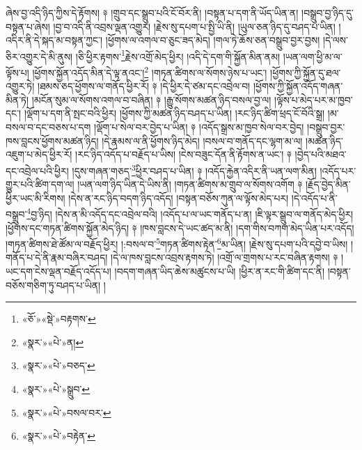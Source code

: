 ཞེས་བྱ་འདི་ཉིད་ཀྱིས་དེ་རྟོགས། ༈ །གྲུབ་དང་སྒྲུབ་པའི་ངོ་བོར་ནི། །བསྟན་པ་དག་ནི་ཡོད་ཡིན་ན། །བསྒྲུབ་བྱ་ཉིད་དུ་བསྟན་པ་ཞེས། །བྱ་བ་འདི་ནི་འབྲས་ལྡན་འགྱུར། །རྗེས་སུ་དཔག་པ་སྤྱི་ཡི་ནི། །ཡུལ་ཅན་ཉིད་དུ་བཤད་པ་ཡིན། །འདིར་ནི་དེ་སྐད་མ་བསྟན་ཀྱང་། །ཕྱོགས་ལ་འགལ་བ་ཅུང་ཟད་མེད། །གལ་ཏེ་ཆོས་ཅན་བསྒྲུབ་བྱར་བྱས། །དེ་ལས་ཅིར་འགྱུར་དེ་མི་ནུས། །ཅི་ཕྱིར་རྟགས་\footnote{«ཅོ་»«སྡེ་»བརྟགས་}རྗེས་འགྲོ་མེད་ཕྱིར། །འདི་དེ་དག་གི་སྐྱོན་མིན་ནམ། །ཡན་ལག་ཕྱི་མ་ལ་ལྟོས་པ། །ཕྱོགས་སྐྱོན་འདོད་མིན་དེ་ལྟ་ནའང་།\footnote{«སྣར་»«པེ་»ན།} །གཏན་ཚིགས་ལ་སོགས་ཉེས་པ་ཡང་། །ཕྱོགས་ཀྱི་སྐྱོན་དུ་ཐལ་འགྱུར་ཏེ། །ཐམས་ཅད་ཕྱོགས་ལ་གནོད་ཕྱིར་རོ། ༈ །དེ་ཕྱིར་དེ་ཙམ་དང་འབྲེལ་བ། །ཕྱོགས་ཀྱི་སྐྱོན་འདོད་གཞན་མིན་ཏེ། །མངོན་སུམ་ལ་སོགས་འགལ་བ་བཞིན། ༈ །རྒྱུ་སོགས་མཚན་ཉིད་བསལ་བྱ་ལ། །ལྟོས་པ་མེད་པར་མ་ཁྱབ་དང་། །ལྡོག་པ་དག་ནི་སྤང་བའི་ཕྱིར། །ཕྱོགས་ཀྱི་མཚན་ཉིད་བཤད་པ་ཡིན། །རང་ཉིད་ཚིག་ཕྲད་ངོ་བོའི་སྒྲ། །མ་བསལ་བ་དང་བཅས་པ་དག །ལྡོག་པ་སེལ་བར་བྱེད་པ་ཡིན། ༈ །འདོད་སྒྲས་མ་ཁྱབ་སེལ་བར་བྱེད། །བསྒྲུབ་བྱར་ཁས་བླངས་ཕྱོགས་མཚན་ཉིད། །དེ་རྣམས་ལ་ནི་ཕྱོགས་ཉིད་མེད། །བསལ་བ་གནོད་དང་ལྷག་མ་ལ། །མཚན་ཉིད་འཇུག་པ་མེད་ཕྱིར་རོ། །རང་ཉིད་འདོད་པ་བརྗོད་པ་ཡིས། །ངེས་བཟུང་དོན་ནི་རྟོགས་ན་ཡང་། ༈ །བྱེད་པའི་མཐའ་དང་འབྲེལ་པའི་ཕྱིར། །དུས་གཞན་གཅད་\footnote{«སྣར་»«པེ་»བཅད་}ཕྱིར་བཤད་པ་ཡིན། ༈ །འདོད་རྐྱེན་འདིར་ནི་ཡན་ལག་མིན། །འདོད་པར་གྱུར་པའི་ཚིག་དག་ལ། །ཡན་ལག་ཉིད་ཡིན་དེ་ཡིས་ནི། །གཏན་ཚིགས་མ་གྲུབ་ལ་སོགས་འགོག ༈ །རྗོད་བྱེད་མིན་ཕྱིར་ཡང་མི་རིགས། །དེས་ན་རང་ཉིད་བདག་ཉིད་འདོད། །བསྟན་བཅོས་ཀུན་ལ་ལྟོས་མེད་པར། །དེ་འདོད་པ་ནི་བསྒྲུབ་\footnote{«སྣར་»«པེ་»སྒྲུབ་}བྱ་ཉིད། །དེས་ན་མི་འདོད་དང་འབྲེལ་བའི། །འདོད་པ་ལ་ཡང་གནོད་པ་ན། །ཇི་ལྟར་སྒྲུབ་ལ་གནོད་མེད་ཕྱིར། །ཕྱོགས་དང་གཏན་ཚིགས་སྐྱོན་མེད་ཉིད། ༈ །ཁས་བླངས་དེ་ཡང་ཚད་མ་ནི། །དག་གིས་བཀག་མེད་ཡིན་པར་འདོད། །གཏན་ཚིགས་ཐེ་ཚོམ་ལ་བརྗོད་ཕྱིར། །:བསལ་བ་\footnote{«སྣར་»«པེ་»བསལ་བར་}གཏན་ཚིགས་རྟེན་\footnote{«སྣར་»«པེ་»བརྟེན་}མ་ཡིན། །རྗེས་སུ་དཔག་པའི་དབྱེ་བ་ཡིས། །གནོད་པ་དེ་ནི་རྣམ་བཞིར་བཤད། །དེ་ལ་ཁས་བླངས་འབྲས་རྟགས་ཏེ། །འགྲོ་ལ་གྲགས་པ་རང་བཞིན་རྟགས། ༈ །ཡང་དག་ངེས་ལྡན་བརྗོད་འདོད་པ། །བདག་གཞན་ཡིད་ཆེས་མཚུངས་པ་ཡི། །ཕྱིར་ན་རང་གི་ཚིག་དང་ནི། །བསྟན་བཅོས་གཅིག་ཏུ་བཤད་པ་ཡིན། །
